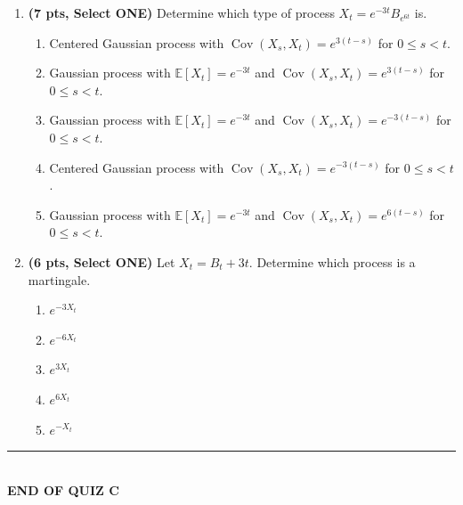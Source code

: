 \documentclass[11pt]{article}
\newcommand{\E}{\mathbb{E}}
\DeclareMathOperator{\Cov}{Cov}
\begin{document}
\begin{enumerate}
\item[\textbf{Q15.}] \textbf{(7 pts, Select ONE)} Determine which type of process $X_t=e^{-3t}B_{e^{6t}}$ is.
\begin{enumerate}
  \item Centered Gaussian process with $\Cov(X_s,X_t)=e^{3(t-s)}$ for $0\le s<t$.
  \item Gaussian process with $\E[X_t]=e^{-3t}$ and $\Cov(X_s,X_t)=e^{3(t-s)}$ for $0\le s<t$.
  \item Gaussian process with $\E[X_t]=e^{-3t}$ and $\Cov(X_s,X_t)=e^{-3(t-s)}$ for $0\le s<t$.
  \item Centered Gaussian process with $\Cov(X_s,X_t)=e^{-3(t-s)}$ for $0\le s<t$.
  \item Gaussian process with $\E[X_t]=e^{-3t}$ and $\Cov(X_s,X_t)=e^{6(t-s)}$ for $0\le s<t$.
\end{enumerate}

\item[\textbf{Q16.}] \textbf{(6 pts, Select ONE)} Let $X_t=B_t+3t$. Determine which process is a martingale.
\begin{enumerate}
  \item $e^{-3X_t}$
  \item $e^{-6X_t}$
  \item $e^{3X_t}$
  \item $e^{6X_t}$
  \item $e^{-X_t}$
\end{enumerate}

\end{enumerate}

\vspace{10pt}
\begin{center}\rule{0.5\textwidth}{0.4pt}\\[2pt]\textbf{END OF QUIZ C}\end{center}
\end{document}
